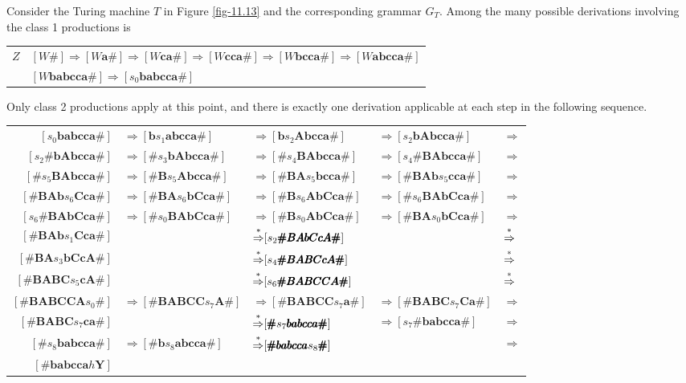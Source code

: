 Consider the Turing machine $T$ in Figure \ref{fig-11.13} and the corresponding grammar
$G_T$. Among the many possible derivations involving the class 1 productions is
\begin{center}\begin{tabular}{r@{ $\Rightarrow$ }l}
$Z$ & $[W\pmb{\#}]\Rightarrow[W\pmb{a\#}]\Rightarrow[W\pmb{ca\#}]\Rightarrow
	[W\pmb{cca\#}]\Rightarrow[W\pmb{bcca\#}]\Rightarrow[W\pmb{abcca\#}]$ \\
& $[W\pmb{babcca\#}]\Rightarrow[s_0\pmb{babcca\#}]$
\end{tabular}\end{center}
Only class 2 productions apply at this point, and there is exactly one
derivation applicable at each step in the following sequence.
\begin{center}\begin{tabular}{r@{ }l@{ }l@{ }l@{ }l}
$[s_0\pmb{babcca\#}]$ & $\Rightarrow[\pmb{b}s_1\pmb{abcca\#}]$ & $\Rightarrow
	[\pmb{b}s_2\pmb{Abcca\#}]$ & $\Rightarrow[s_2\pmb{bAbcca\#}]$ &
	$\Rightarrow$ \\
$[s_2\pmb{\#bAbcca\#}]$ & $\Rightarrow[\pmb{\#}s_3\pmb{bAbcca\#}]$ &
	$\Rightarrow[\pmb{\#}s_4\pmb{BAbcca\#}]$ & $\Rightarrow[s_4\pmb{\#BAbcca
	\#}]$ & $\Rightarrow$ \\
$[\pmb{\#}s_5\pmb{BAbcca\#}]$ & $\Rightarrow[\pmb{\#B}s_5\pmb{Abcca\#}]$ &
	$\Rightarrow[\pmb{\#BA}s_5\pmb{bcca\#}]$ & $\Rightarrow[\pmb{\#BAb}s_5
	\pmb{cca\#}]$ & $\Rightarrow$ \\
$[\pmb{\#BAb}s_6\pmb{Cca\#}]$ & $\Rightarrow[\pmb{\#BA}s_6\pmb{bCca\#}]$ & 
	$\Rightarrow[\pmb{\#B}s_6\pmb{AbCca\#}]$ & $\Rightarrow[\pmb{\#}s_6
	\pmb{BAbCca\#}]$ & $\Rightarrow$ \\
$[s_6\pmb{\#BAbCca\#}]$ & $\Rightarrow[\pmb{\#}s_0\pmb{BAbCca\#}]$ &
	$\Rightarrow[\pmb{\#B}s_0\pmb{AbCca\#}]$ & $\Rightarrow[\pmb{\#BA}s_0
	\pmb{bCca\#}]$ & $\Rightarrow$ \\
$[\pmb{\#BAb}s_1\pmb{Cca\#}]$ && $\operatorname{\overset{*}{\Rightarrow}}[s_2\pmb{\#BAbCcA\#}]$ &&
	$\operatorname{\overset{*}{\Rightarrow}}$ \\
$[\pmb{\#BA}s_3\pmb{bCcA\#}]$ && $\operatorname{\overset{*}{\Rightarrow}}[s_4\pmb{\#BABCcA\#}]$ &&
	$\operatorname{\overset{*}{\Rightarrow}}$ \\
$[\pmb{\#BABC}s_5\pmb{cA\#}]$ && $\operatorname{\overset{*}{\Rightarrow}}[s_6\pmb{\#BABCCA\#}]$ &&
	$\operatorname{\overset{*}{\Rightarrow}}$ \\
$[\pmb{\#BABCCA}s_0\pmb{\#}]$ & $\Rightarrow[\pmb{\#BABCC}s_7\pmb{A\#}]$ &
	$\Rightarrow[\pmb{\#BABCC}s_7\pmb{a\#}]$ & $\Rightarrow[\pmb{\#BABC}s_7
	\pmb{Ca\#}]$ & $\Rightarrow$ \\
$[\pmb{\#BABC}s_7\pmb{ca\#}]$ && $\operatorname{\overset{*}{\Rightarrow}}[\pmb{\#}s_7\pmb{babcca\#}]$ &
	$\Rightarrow[s_7\pmb{\#babcca\#}]$ & $\Rightarrow$ \\
$[\pmb{\#}s_8\pmb{babcca\#}]$ & $\Rightarrow[\pmb{\#b}s_8\pmb{abcca\#}]$ & 
	$\operatorname{\overset{*}{\Rightarrow}}[\pmb{\#babcca}s_8\pmb{\#}]$ && $\Rightarrow$ \\
$[\pmb{\#babcca}h\pmb{Y}]$
\end{tabular}\end{center}
